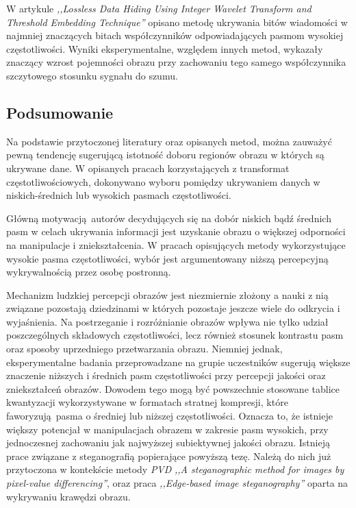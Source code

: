 {{{            W artykule \textit{,,Lossless Data Hiding Using Integer Wavelet Transform and Threshold Embedding
            Technique''} opisano metodę ukrywania bitów wiadomości w najmniej znaczących bitach współczynników
            odpowiadających pasmom wysokiej częstotliwości. Wyniki eksperymentalne, względem innych metod, wykazały
            znaczący wzrost pojemności obrazu przy zachowaniu tego samego współczynnika szczytowego stosunku sygnału do
            szumu\cite{Xuan2005LosslessDH}.}

        \subsection{Podsumowanie}
        {
            Na podstawie przytoczonej literatury oraz opisanych metod, można zauważyć pewną tendencję sugerującą
            istotność doboru regionów obrazu w których są ukrywane dane. W opisanych pracach korzystających z
            transformat częstotliwościowych, dokonywano wyboru pomiędzy ukrywaniem danych w
            niskich-średnich\cite{Huang2000EmbeddingIW, DataHidinginJPEG, Li2007ASM} lub wysokich pasmach
            częstotliwości\cite{Xuan2005LosslessDH, Muhuri2020ANI}.

            Główną motywacją autorów decydujących się na dobór niskich bądź średnich pasm w celach ukrywania informacji
            jest uzyskanie obrazu o większej odporności na manipulacje i zniekształcenia. W pracach opisujących metody
            wykorzystujące wysokie pasma częstotliwości, wybór jest argumentowany niższą percepcyjną wykrywalnością
            przez osobę postronną.

            Mechanizm ludzkiej percepcji obrazów jest niezmiernie złożony a nauki z nią związane pozostają dziedzinami w
            których pozostaje jeszcze wiele do odkrycia i wyjaśnienia. Na postrzeganie i rozróżnianie obrazów wpływa nie
            tylko udział poszczególnych składowych częstotliwości, lecz również stosunek kontrastu pasm oraz sposoby
            uprzedniego przetwarzania obrazu\cite{Perfetto2020EffectsOS}. Niemniej jednak, eksperymentalne badania
            przeprowadzane na grupie uczestników sugerują większe znaczenie niższych i średnich pasm częstotliwości przy
            percepcji jakości oraz zniekształceń obrazów. Dowodem tego mogą być powszechnie stosowane tablice
            kwantyzacji wykorzystywane w formatach stratnej kompresji, które faworyzują pasma o średniej lub niższej
            częstotliwości\cite{ImageCompressionDCT}. Oznacza to, że istnieje większy potencjał w manipulacjach obrazem
            w zakresie pasm wysokich, przy jednoczesnej zachowaniu jak najwyższej subiektywnej jakości obrazu. Istnieją
            prace związane z steganografią popierające powyższą tezę. Należą do nich już przytoczona w kontekście metody
            \textit{PVD} \textit{,,A steganographic method for images by pixel-value differencing''}\cite{Wu2003ASM},
            oraz praca \textit{,,Edge-based image steganography''} oparta na wykrywaniu krawędzi
            obrazu\cite{Islam2014EdgebasedIS}.
        }
    }
}

